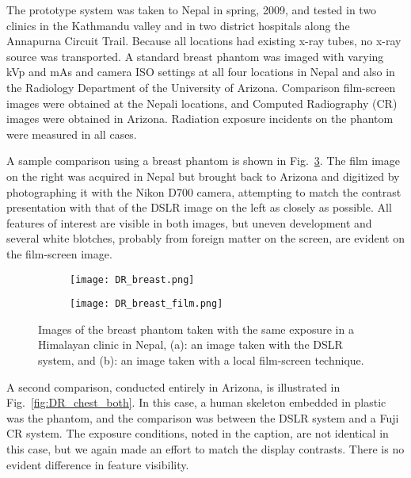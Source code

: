 The prototype system was taken to Nepal in spring, 2009, and tested in two clinics in the Kathmandu valley and in two district hospitals along the Annapurna Circuit Trail.  Because all locations had existing x-ray tubes, no x-ray source was transported. A standard breast phantom was imaged with varying kVp and mAs and camera ISO settings at all four locations in Nepal and also in the Radiology Department of the University of Arizona.  Comparison film-screen images were obtained at the Nepali locations, and Computed Radiography (CR) images were obtained in Arizona.  Radiation exposure incidents on the phantom were measured in all cases.

A sample comparison using a breast phantom is shown in Fig.~\ref{fig:DR_breast_both}. The film image on the right was acquired in Nepal but brought back to Arizona and digitized by photographing it with the Nikon D700 camera, attempting to match the contrast presentation with that of the DSLR image on the left as closely as possible. All features of interest are visible in both images, but uneven development and several white blotches, probably from foreign matter on the screen, are evident on the film-screen image.

\begin{figure}[h]
\centering
	\begin{subfigure}[b]{0.4\linewidth}
		\texttt{[image: DR\_breast.png]}
		\caption{}
		\label{fig:DR_breast}
	\end{subfigure}
	\hspace{1 cm}
	\begin{subfigure}[b]{0.4\linewidth}
		\texttt{[image: DR\_breast\_film.png]}
		\caption{}
		\label{fig:DR_breast_film}
	\end{subfigure}
	\caption{Images of the breast phantom taken with the same exposure in a Himalayan clinic in Nepal, (a): an image taken with the DSLR system, and (b): an image taken with a local film-screen technique.}
	\label{fig:DR_breast_both}
\end{figure}

A second comparison, conducted entirely in Arizona, is illustrated in Fig.~\ref{fig:DR_chest_both}. In this case, a human skeleton embedded in plastic was the phantom, and the comparison was between the DSLR system and a Fuji CR system. The exposure conditions, noted in the caption, are not identical in this case, but we again made an effort to match the display contrasts. There is no evident difference in feature visibility.

